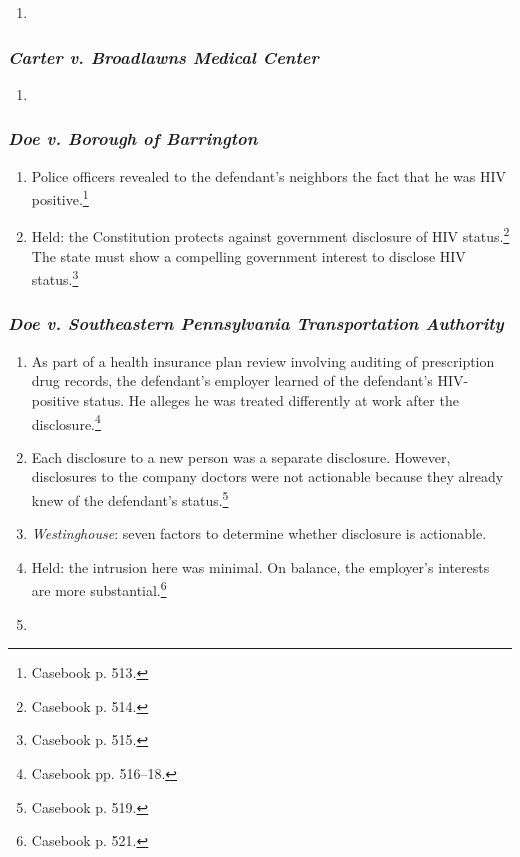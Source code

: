 \begin{enumerate}
    \item %
\end{enumerate}

\subsubsection{\emph{Carter v. Broadlawns Medical Center}}

\begin{enumerate}
    \item %
\end{enumerate}

\subsubsection{\emph{Doe v. Borough of Barrington}}

\begin{enumerate}
    \item Police officers revealed to the defendant's neighbors the fact that he 
    was HIV positive.\footnote{Casebook p. 513.}
    \item Held: the Constitution protects against government disclosure of HIV 
    status.\footnote{Casebook p. 514.} The state must show a compelling 
    government interest to disclose HIV status.\footnote{Casebook p. 515.}
\end{enumerate}

\subsubsection{\emph{Doe v. Southeastern Pennsylvania Transportation Authority}}

\begin{enumerate}
    \item As part of a health insurance plan review involving auditing of 
    prescription drug records, the defendant's employer learned of the 
    defendant's HIV-positive status. He alleges he was treated differently at 
    work after the disclosure.\footnote{Casebook pp. 516--18.}
    \item Each disclosure to a new person was a separate 
    disclosure. However, disclosures to the company doctors were not actionable 
    because they already knew of the defendant's status.\footnote{Casebook p. 
    519.}
    \item \emph{Westinghouse}: seven factors to determine whether disclosure is 
    actionable.
    \item Held: the intrusion here was minimal. On balance, the employer's 
    interests are more substantial.\footnote{Casebook p. 521.}
    \item %
\end{enumerate}


